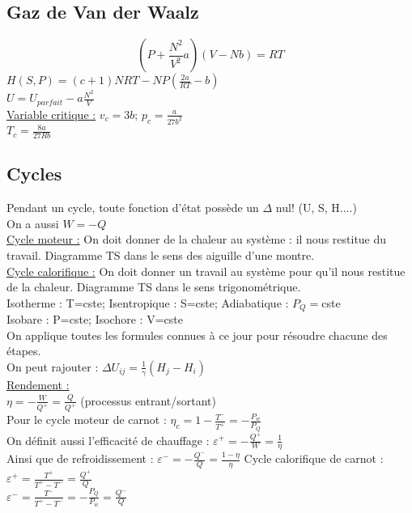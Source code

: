 \documentclass[../main.tex]{subfiles}
\begin{document}
\subsection{Gaz de Van der Waalz}
\begin{equation}
    (P+\frac{N^2}{V^2}a)(V-Nb) = RT
\end{equation}
$H(S,P) = (c+1)NRT - NP(\frac{2a}{RT}-b)$\\
$U = U_{parfait} - a\frac{N^2}{V}$\\

\quad \underline{Variable critique :}
$v_c = 3b$; $p_c = \frac{a}{27b^2}$\\
$T_c = \frac{8a}{27Rb}$\\

\subsection{Cycles}
Pendant un cycle, toute fonction d'état possède un $\Delta$ nul! (U, S, H....)\\
On a aussi $W = -Q$\\
\quad \underline{Cycle moteur :} On doit donner de la chaleur au système : il nous restitue du travail. Diagramme TS dans le sens des aiguille d'une montre.\\

\quad \underline{Cycle calorifique :} On doit donner un travail au système pour qu'il nous restitue de la chaleur. Diagramme TS dans le sens trigonométrique.\\

Isotherme : T=cste; Isentropique : S=cste; Adiabatique : $P_Q =$cste\\
Isobare : P=cste; Isochore : V=cste\\

On applique toutes les formules connues à ce jour pour résoudre chacune des étapes.\\

On peut rajouter : $\Delta U_{ij} = \frac{1}{\gamma} (H_j - H_i)$\\

\quad \underline{Rendement :}\\
$\eta = -\frac{W}{Q^+} = \frac{Q}{Q^+}$ (processus entrant/sortant)\\
Pour le cycle moteur de carnot : $\eta_c = 1-\frac{T^-}{T^+} = -\frac{P_w}{P_Q}$\\

On définit aussi l'efficacité de chauffage : $\varepsilon^+ = -\frac{Q^+}{W} = \frac{1}{\eta}$\\
Ainsi que de refroidissement : $\varepsilon^- = -\frac{Q^-}{Q} = \frac{1-\eta}{\eta}$
Cycle calorifique de carnot : $\varepsilon^+ = \frac{T^+}{T^+-T^-} = \frac{Q^+}{Q}$\\
$\varepsilon^- = \frac{T^-}{T^+-T^-} = -\frac{P_Q}{P_w}= \frac{Q^-}{Q}$
\end{document}
